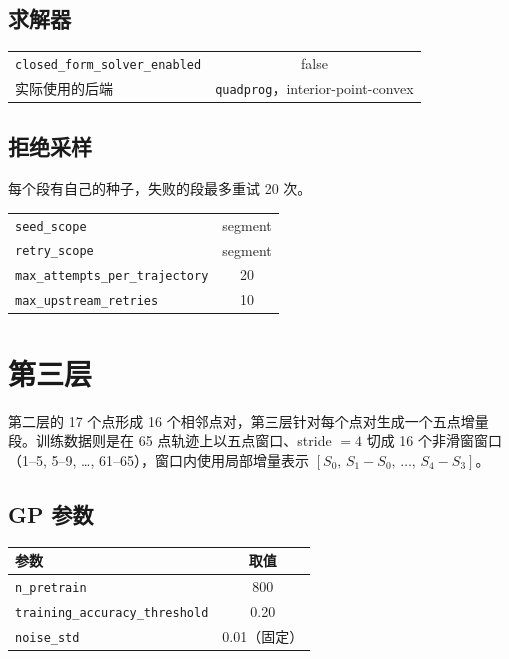 \documentclass[11pt,a4paper]{ctexart}
\newcommand{\cf}[1]{\texttt{\small #1}}
\begin{document}
\subsection{求解器}
\begin{center}
\small
\begin{tabular}{@{}lc@{}}
\toprule
\cf{closed\_form\_solver\_enabled} & false \\
实际使用的后端 & \cf{quadprog}，interior-point-convex \\
\bottomrule
\end{tabular}
\end{center}

\subsection{拒绝采样}
每个段有自己的种子，失败的段最多重试 20 次。

\begin{center}
\small
\begin{tabular}{@{}lc@{}}
\toprule
\cf{seed\_scope} & segment \\
\cf{retry\_scope} & segment \\
\cf{max\_attempts\_per\_trajectory} & 20 \\
\cf{max\_upstream\_retries} & 10 \\
\bottomrule
\end{tabular}
\end{center}

\section{第三层}

第二层的 17 个点形成 16 个相邻点对，第三层针对每个点对生成一个五点增量段。训练数据则是在 65 点轨迹上以五点窗口、stride $=4$ 切成 16 个非滑窗窗口（1--5, 5--9, \ldots, 61--65），窗口内使用局部增量表示 $[S_0,\,S_1-S_0,\,\ldots,\,S_4-S_3]$。

\subsection{GP 参数}
\begin{center}
\small
\begin{tabular}{@{}lc@{}}
\toprule
\textbf{参数} & \textbf{取值} \\
\midrule
\cf{n\_pretrain} & 800 \\
\cf{training\_accuracy\_threshold} & 0.20 \\
\cf{noise\_std} & 0.01（固定） \\
\bottomrule
\end{tabular}
\end{center}
\end{document}

